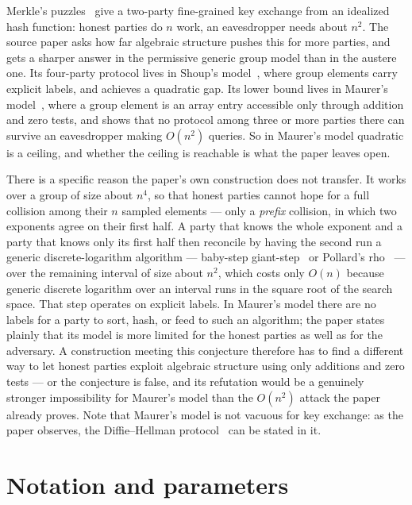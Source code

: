 \documentclass{aicr-conjecture}
\begin{document}
Merkle's puzzles~\cite{Mer78} give a two-party fine-grained key exchange
from an idealized hash function: honest parties do $n$ work, an
eavesdropper needs about $n^{2}$. The source paper asks how far
algebraic structure pushes this for more parties, and gets a sharper
answer in the permissive generic group model than in the austere one.
Its four-party protocol lives in Shoup's model~\cite{Sho97}, where group
elements carry explicit labels, and achieves a quadratic gap. Its lower
bound lives in Maurer's model~\cite{Mau05}, where a group element is an
array entry accessible only through addition and zero tests, and shows
that no protocol among three or more parties there can survive an
eavesdropper making $O(n^{2})$ queries. So in Maurer's model quadratic
is a ceiling, and whether the ceiling is reachable is what the paper
leaves open.

There is a specific reason the paper's own construction does not
transfer. It works over a group of size about $n^{4}$, so that honest
parties cannot hope for a full collision among their $n$ sampled
elements --- only a \emph{prefix} collision, in which two exponents
agree on their first half. A party that knows the whole exponent and a
party that knows only its first half then reconcile by having the second
run a generic discrete-logarithm algorithm --- baby-step
giant-step~\cite{Sha71} or Pollard's rho~\cite{Pol75} --- over the
remaining
interval of size about $n^{2}$, which costs only $O(n)$ because generic
discrete logarithm over an interval runs in the square root of the
search space. That step operates on explicit labels. In Maurer's model
there are no labels for a party to sort, hash, or feed to such an
algorithm; the paper states plainly that its model is more limited for
the honest parties as well as for the adversary. A construction meeting
this conjecture therefore has to find a different way to let honest
parties exploit algebraic structure using only additions and zero tests
--- or the conjecture is false, and its refutation would be a genuinely
stronger impossibility for Maurer's model than the $O(n^{2})$ attack the
paper already proves. Note that Maurer's model is not vacuous for key
exchange: as the paper observes, the Diffie--Hellman
protocol~\cite{DH76} can be stated in it.

\section{Notation and parameters}\label{sec:notation}
\end{document}
